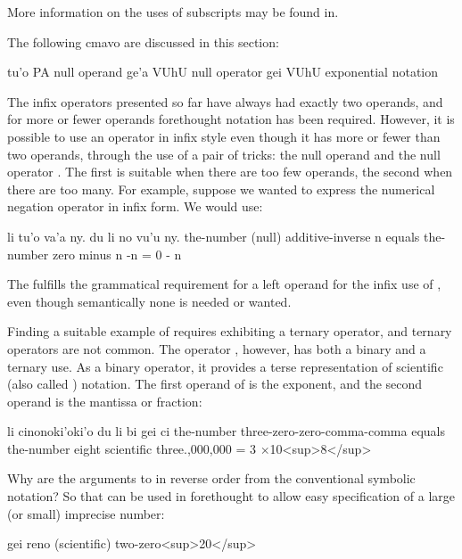 More information on the uses of subscripts may be found in.



The following cmavo are discussed in this section:

   tu'o    PA  null operand
    ge'a    VUhU    null operator
    gei VUhU    exponential notation

The infix operators presented so far have always had exactly
    two operands, and for more or fewer operands forethought
    notation has been required. However, it is possible to use an
    operator in infix style even though it has more or fewer than
    two operands, through the use of a pair of tricks: the null
    operand  and the null operator . The first is
    suitable when there are too few operands, the second when there
    are too many. For example, suppose we wanted to express the
    numerical negation operator  in infix form. We would
    use:
\begin{example}
li tu'o va'a ny. du\n
\T	li no vu'u ny.\n
the-number (null) additive-inverse n equals\n
\T	the-number zero minus n\n
-n = 0 - n
\end{example}

The  fulfills the grammatical requirement for a left
    operand for the infix use of , even though semantically
    none is needed or wanted. 

Finding a suitable example of  requires exhibiting a
    ternary operator, and ternary operators are not common. The
    operator , however, has both a binary and a ternary use.
    As a binary operator, it provides a terse representation of
    scientific (also called ) notation. The first
    operand of  is the exponent, and the second operand is
    the mantissa or fraction:
\begin{example}
li cinonoki'oki'o\n
\T	du li bi gei ci\n
the-number three-zero-zero-comma-comma\n
\T	equals the-number eight scientific three.,000,000 = 3 $\times$10<sup>8</sup>
\end{example}

Why are the arguments to  in reverse order from the
    conventional symbolic notation? So that  can be used in
    forethought to allow easy specification of a large (or small)
    imprecise number:
\begin{example}
gei reno\n
(scientific) two-zero<sup>20</sup>
\end{example}

